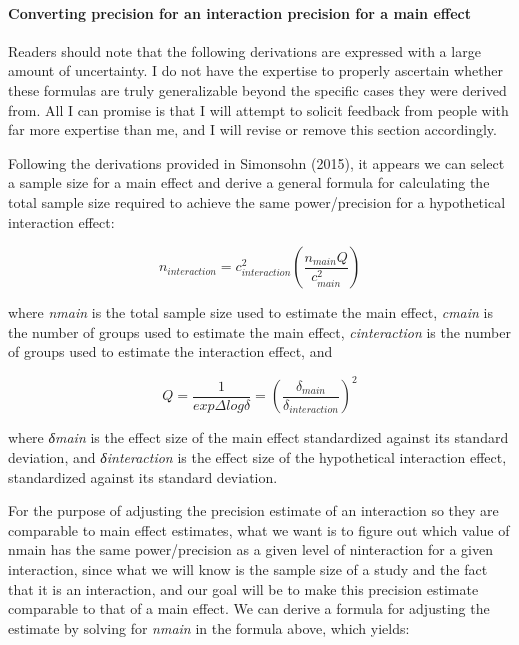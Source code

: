 \documentclass[]{article}
\let\oldparagraph\paragraph
\renewcommand{\paragraph}[1]{\oldparagraph{#1}\mbox{}}
\begin{document}
\hypertarget{converting-precision-for-an-interaction-precision-for-a-main-effect}{%
\paragraph{Converting precision for an interaction precision for a main
effect}\label{converting-precision-for-an-interaction-precision-for-a-main-effect}}

Readers should note that the following derivations are expressed with a
large amount of uncertainty. I do not have the expertise to properly
ascertain whether these formulas are truly generalizable beyond the
specific cases they were derived from. All I can promise is that I will
attempt to solicit feedback from people with far more expertise than me,
and I will revise or remove this section accordingly.

Following the derivations provided in Simonsohn (2015), it appears we
can select a sample size for a main effect and derive a general formula
for calculating the total sample size required to achieve the same
power/precision for a hypothetical interaction effect:

\[
\begin{equation}
n_{interaction}=c_{interaction}^2(\frac{n_{main}Q}{c_{main}^2})
\label{eq:maintoint}
\tag{12}
\end{equation}
\]

where \emph{nmain} is the total sample size used to estimate the main
effect, \emph{cmain} is the number of groups used to estimate the main
effect, \emph{cinteraction} is the number of groups used to estimate the
interaction effect, and

\[
\begin{equation}
Q=\frac{1}{exp{\Delta}log \delta}=(\frac{\delta_{main}}{\delta_{interaction}})^2
\label{eq:Qdef}
\tag{13}
\end{equation}
\]

where \emph{δmain} is the effect size of the main effect standardized
against its standard deviation, and \emph{δinteraction} is the effect
size of the hypothetical interaction effect, standardized against its
standard deviation.

For the purpose of adjusting the precision estimate of an interaction so
they are comparable to main effect estimates, what we want is to figure
out which value of nmain has the same power/precision as a given level
of ninteraction for a given interaction, since what we will know is the
sample size of a study and the fact that it is an interaction, and our
goal will be to make this precision estimate comparable to that of a
main effect. We can derive a formula for adjusting the estimate by
solving for \emph{nmain} in the formula above, which yields:
\end{document}
